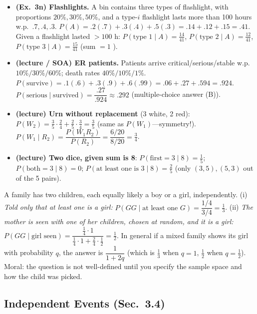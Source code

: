 \documentclass[11pt]{article}
\let\oldsubsection\subsection
\renewcommand{\subsection}{\Needspace{14\baselineskip}\oldsubsection}
\begin{document}
\begin{exbox}
\begin{itemize}
\item \textbf{(Ex.\ 3n) Flashlights.} A bin contains three types of flashlight, with proportions $20\%,30\%,50\%$, and a type-$i$ flashlight lasts more than 100 hours w.p.\ $.7,.4,.3$. $P(A)=.2(.7)+.3(.4)+.5(.3)=.14+.12+.15=.41$. Given a flashlight lasted $>100$ h: $P(\text{type }1\mid A)=\tfrac{14}{41}$, $P(\text{type }2\mid A)=\tfrac{12}{41}$, $P(\text{type }3\mid A)=\tfrac{15}{41}$ (sum $=1$ \checkmark).
\item \textbf{(lecture / SOA) ER patients.} Patients arrive critical/serious/stable w.p.\ $10\%/30\%/60\%$; death rates $40\%/10\%/1\%$. $P(\text{survive})=.1(.6)+.3(.9)+.6(.99)=.06+.27+.594=.924$. $P(\text{serious}\mid\text{survived})=\dfrac{.27}{.924}\approx.292$ (multiple-choice answer (B)).
\item \textbf{(lecture) Urn without replacement} (3 white, 2 red): $P(W_2)=\tfrac35\cdot\tfrac24+\tfrac25\cdot\tfrac34=\tfrac35$ (same as $P(W_1)$---symmetry!). $P(W_1\mid R_2)=\dfrac{P(W_1R_2)}{P(R_2)}=\dfrac{6/20}{8/20}=\tfrac34$.
\item \textbf{(lecture) Two dice, given sum is 8}: $P(\text{first}=3\mid8)=\tfrac15$; $P(\text{both}=3\mid8)=0$; $P(\text{at least one is }3\mid8)=\tfrac25$ (only $(3,5),(5,3)$ out of the 5 pairs).
\end{itemize}
\end{exbox}

\begin{exbox}
A family has two children, each equally likely a boy or a girl, independently. (i) \emph{Told only that at least one is a girl:} $P(GG\mid\text{at least one }G)=\dfrac{1/4}{3/4}=\tfrac13$. (ii) \emph{The mother is seen with one of her children, chosen at random, and it is a girl:} $P(GG\mid\text{girl seen})=\dfrac{\frac14\cdot1}{\frac14\cdot1+\frac24\cdot\frac12}=\tfrac12$. In general if a mixed family shows its girl with probability $q$, the answer is $\dfrac1{1+2q}$ (which is $\tfrac13$ when $q=1$, $\tfrac12$ when $q=\tfrac12$). Moral: the question is not well-defined until you specify the sample space and how the child was picked.
\end{exbox}

\subsection{Independent Events (Sec.\ 3.4)}\label{sec:indep}
\end{document}
